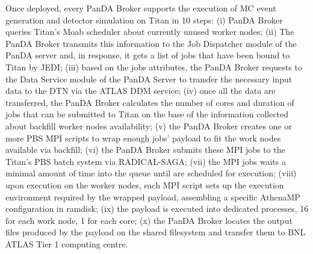 Once deployed, every PanDA Broker supports the execution of MC event generation
and detector simulation on Titan in 10 steps: (i) PanDA Broker queries Titan's
Moab scheduler about currently unused worker nodes;
(ii) The PanDA Broker transmits this information to the Job Dispatcher module of
the PanDA server and, in response, it gets a list of jobs that have been bound
to Titan by JEDI; (iii) based on the jobs attributes, the PanDA Broker requests
to the Data Service module of the PanDA Server to transfer the necessary input
data to the DTN via the ATLAS DDM service; (iv) once all the data are
transferred, the PanDA Broker calculates the number of cores and duration of
jobs that can be submitted to Titan on the base of the information collected
about backfill worker nodes availability; (v) the PanDA Broker creates one or
more PBS MPI scripts to wrap enough jobs' payload to fit the work nodes
available via backfill; (vi) the PanDA Broker submits these MPI jobs to the
Titan's PBS batch system via RADICAL-SAGA; (vii) the MPI jobs waits a minimal
amount of time into the queue until are scheduled for execution; (viii) upon
execution on the worker nodes, each MPI script sets up the execution environment
required by the wrapped payload, assembling a specific AthenaMP configuration in
ramdisk; (ix) the payload is executed into dedicated processes, 16 for each work
node, 1 for each core; (x) the PanDA Broker locates the output files produced by
the payload on the shared filesystem and transfer them to BNL ATLAS Tier 1
computing centre.





